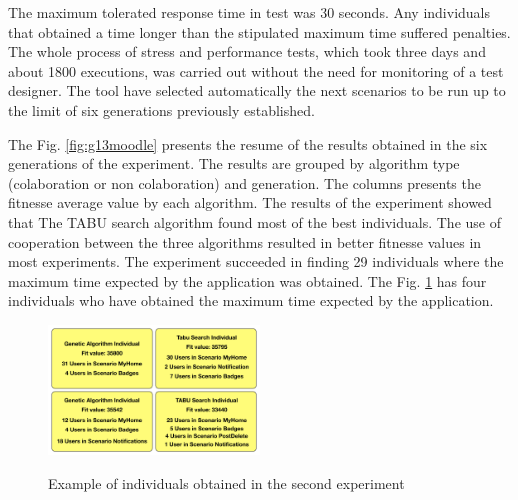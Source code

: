 The maximum tolerated response time in test was 30 seconds.  Any  individuals that obtained a time longer than the stipulated maximum time suffered penalties.  The whole process of stress and performance tests, which took three days and about 1800 executions, was carried out without the need for monitoring of a test designer. The tool have  selected automatically the next scenarios to be run up to the limit of six generations previously established. 

The Fig. \ref{fig:g13moodle} presents the resume of the results obtained in the six generations of the experiment. The results are grouped by algorithm type (colaboration or non colaboration) and generation.  The columns presents the fitnesse average value by each algorithm. The results of the experiment showed that The TABU search algorithm found most of the best individuals. The use of cooperation between the three algorithms resulted in better fitnesse values in most experiments. The experiment succeeded in finding 29 individuals where the maximum time expected by the application was obtained.  The Fig. \ref{fig:individuals} has four individuals who have obtained the maximum time expected by the application.

\begin{figure}[h]
\centering
\caption{Example of individuals obtained in the second experiment}
\includegraphics[width=0.5\textwidth]{./images/individuals.png}
\label{fig:individuals}
\end{figure}

